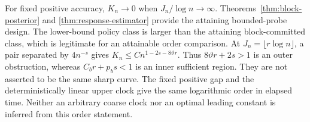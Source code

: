For fixed positive accuracy, $K_n\to0$ when $J_n/\log n\to\infty$.
Theorems~\ref{thm:block-posterior} and \ref{thm:response-estimator} provide
the attaining bounded-probe design. The lower-bound policy class is larger
than the attaining block-committed class, which is legitimate for an attainable
order comparison. At $J_n=\lfloor r\log n\rfloor$, a pair separated by
$4n^{-s}$ gives $K_n\le Cn^{1-2s-8\vartheta r}$. Thus
$8\vartheta r+2s>1$ is an outer obstruction, whereas $C_br+p_bs<1$ is an
inner sufficient region. They are not asserted to be the same sharp curve.
The fixed positive gap and the deterministically linear upper clock give the
same logarithmic order in elapsed time. Neither an arbitrary coarse clock nor
an optimal leading constant is inferred from this order statement.

